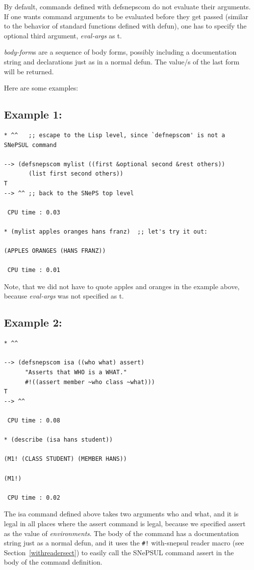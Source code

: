 \documentclass{book}
\newcommand{\ct}[1]{{\ttfamily #1}} %
\begin{document}
By default, commands defined with \ct{defsnepscom} do not evaluate their
arguments. If one wants command arguments to be evaluated before they get
passed (similar to the behavior of standard functions defined with \ct{defun}),
one has to specify the optional third argument, {\it eval-args} as \ct{t}.

{\it body-form\/}s are a sequence of body forms, possibly including a
documentation string and declarations just as in a normal \ct{defun}. The
value/s of the last form will be returned.

Here are some examples:

\subsection*{Example 1:}
\begin{verbatim}
* ^^   ;; escape to the Lisp level, since `defnepscom' is not a SNePSUL command

--> (defsnepscom mylist ((first &optional second &rest others))
       (list first second others))
T
--> ^^ ;; back to the SNePS top level

 CPU time : 0.03 

* (mylist apples oranges hans franz)  ;; let's try it out:

(APPLES ORANGES (HANS FRANZ))

 CPU time : 0.01
\end{verbatim}
Note, that we did not have to quote \ct{apples} and \ct{oranges} in
the example above, because {\it eval-args} was not specified as \ct{t}.

\subsection*{Example 2:}
\begin{verbatim}
* ^^

--> (defsnepscom isa ((who what) assert)
      "Asserts that WHO is a WHAT."
      #!((assert member ~who class ~what)))
T
--> ^^

 CPU time : 0.08 

* (describe (isa hans student))

(M1! (CLASS STUDENT) (MEMBER HANS))

(M1!)

 CPU time : 0.02
\end{verbatim}
The \ct{isa} command defined above takes two arguments \ct{who} and
\ct{what}, and it is legal in all places where the \ct{assert} command
is legal, because we specified \ct{assert} as the value of {\it
environments}. The body of the command has a documentation string just
as a normal \ct{defun}, and it uses the \verb|#!| with-snepsul reader
macro (see Section~\ref{withreadersect}) to easily call the SNePSUL
command \ct{assert} in the body of the command definition.
\end{document}
